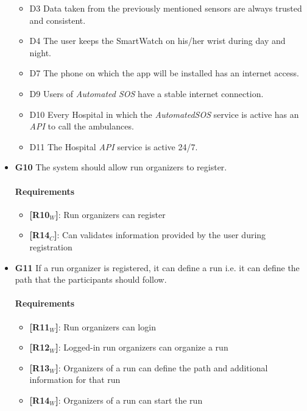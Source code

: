 \begin{itemize}
\begin{itemize}
     \item  D3  Data taken from the previously mentioned sensors are always trusted and consistent.
            
     \item  D4  The user keeps the SmartWatch on his/her wrist during day and night.
    
     \item  D7  The phone on which the app will be installed has an internet access.
     
    \item  D9  Users of \textit{Automated SOS} have a stable internet connection.
    
    \item  D10  Every Hospital in which the \textit{AutomatedSOS} service is active has an \textit{API} to call the ambulances.
    
    \item  D11  The Hospital \textit{API} service is active 24/7.
   \end{itemize}
   
   
    \item \textbf{G10} The system should allow run organizers to register.
    \paragraph{Requirements}
   \begin{itemize}
    \item \textbf{[R10$_W$]}: Run organizers can register
    \item \textbf{[R14$_C$]}: Can validates information provided by the user during registration
   \end{itemize}
    
    
    \item \textbf{G11} If a run organizer is registered, it can define a run i.e. it can define the path that the participants should follow.
    \paragraph{Requirements}
   \begin{itemize}
    \item \textbf{[R11$_W$]}: Run organizers can login
    \item \textbf{[R12$_W$]}: Logged-in run organizers can organize a run
    \item \textbf{[R13$_W$]}: Organizers of a run can define the path and additional information for that run
    \item \textbf{[R14$_W$]}: Organizers of a run can start the run
   \end{itemize}
   

\end{itemize}
